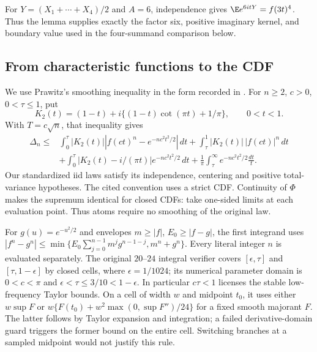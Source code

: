 For $Y=(X_1+\cdots+X_4)/2$ and $A=6$, independence gives
$\E e^{6itY}=f(3t)^4$. Thus the lemma supplies exactly the
factor six, positive imaginary kernel, and boundary value used in the
four-summand comparison below.

\subsection{From characteristic functions to the CDF}
\label{j:fourier:prawitz}
We use Prawitz's smoothing inequality in the form recorded in
\cite[Lemma 4.1, p.~263]{Shevtsova2012}. For $n\ge2$, $c>0$, $0<\tau\le1$, put
\[
 K_2(t)=(1-t)+i\{(1-t)\cot(\pi t)+1/\pi\},\qquad 0<t<1.
\]
With $T=c\sqrt n$, that inequality gives
\begin{align*}
 \Delta_n\le{}&\int_0^\tau |K_2(t)|
   |f(ct)^n-e^{-nc^2t^2/2}|\,dt
 +\int_\tau^1|K_2(t)|\,|f(ct)|^n\,dt\\
 &+\int_0^\tau|K_2(t)-i/(\pi t)|e^{-nc^2t^2/2}\,dt
 +\frac1\pi\int_\tau^\infty e^{-nc^2t^2/2}\frac{dt}{t}.
\end{align*}
Our standardized iid laws satisfy its independence, centering and positive
total-variance hypotheses. The cited convention uses a strict CDF.
Continuity of $\Phi$ makes the supremum identical for closed CDFs: take
one-sided limits at each evaluation point. Thus atoms require no smoothing
of the original law.

For $g(u)=e^{-u^2/2}$ and envelopes $m\ge|f|$, $E_0\ge|f-g|$,
the first integrand uses
$|f^n-g^n|\le\min\{E_0\sum_{j=0}^{n-1}m^jg^{n-1-j},m^n+g^n\}$.
Every literal integer $n$ is evaluated separately. The original $20$--$24$ integral verifier
covers $[\epsilon,\tau]$ and $[\tau,1-\epsilon]$ by closed cells,
where $\epsilon=1/1024$; its numerical parameter domain is
$0<c<\pi$ and $\epsilon<\tau\le3/10<1-\epsilon$.
In particular $c\tau<1$ licenses the stable low-frequency Taylor bounds.
On a cell of width $w$ and midpoint $t_0$,
it uses either $w\sup F$ or
$w\{F(t_0)+w^2\max(0,\sup F'')/24\}$ for a fixed smooth majorant
$F$. The latter follows by Taylor expansion and integration; a failed
derivative-domain guard triggers the former bound on the entire cell.
Switching branches at a sampled midpoint would not justify this rule.

